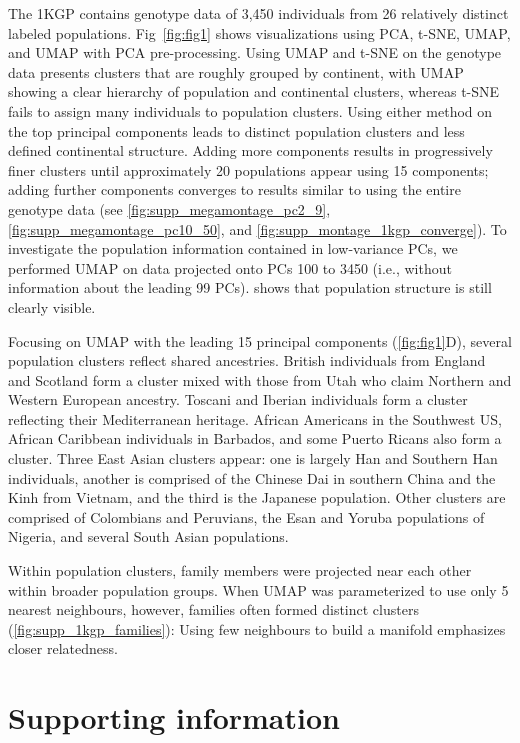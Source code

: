 The 1KGP contains genotype data of 3,450 individuals from 26 relatively distinct labeled populations\citep{10002015global}. Fig~\ref{fig:fig1} shows visualizations using PCA, t-SNE, UMAP, and UMAP with PCA pre-processing. Using UMAP and t-SNE on the genotype data presents clusters that are roughly grouped by continent, with UMAP showing a clear hierarchy of population and continental clusters, whereas t-SNE fails to assign many individuals to population clusters. Using either method on the top principal components leads to distinct population clusters and less defined continental structure. Adding more components results in progressively finer clusters until approximately 20 populations appear using 15 components; adding further components converges to results similar to using the entire genotype data (see \ref{fig:supp_megamontage_pc2_9}, \ref{fig:supp_megamontage_pc10_50}, and \ref{fig:supp_montage_1kgp_converge}). To investigate the population information contained in low-variance PCs, we performed UMAP on data projected onto PCs 100 to 3450 (i.e., without information about the leading 99 PCs).  shows that population structure is still clearly visible.

Focusing on UMAP with the leading 15 principal components (\ref{fig:fig1}D), several population clusters reflect shared ancestries. British individuals from England and Scotland form a cluster mixed with those from Utah who claim Northern and Western European ancestry. Toscani and Iberian individuals form a cluster reflecting their Mediterranean heritage. African Americans in the Southwest US, African Caribbean individuals in Barbados, and some Puerto Ricans also form a cluster. Three East Asian clusters appear: one is largely Han and Southern Han individuals, another is comprised of the Chinese Dai in southern China and the Kinh from Vietnam, and the third is the Japanese population. Other clusters are comprised of Colombians and Peruvians, the Esan and Yoruba populations of Nigeria, and several South Asian populations. 

Within population clusters, family members were projected near each other within broader population groups. When UMAP was parameterized to use only 5 nearest neighbours, however, families often formed distinct clusters (\ref{fig:supp_1kgp_families}): Using few neighbours to build a manifold emphasizes closer relatedness.

\newpage

\section{Supporting information}


\newpage
